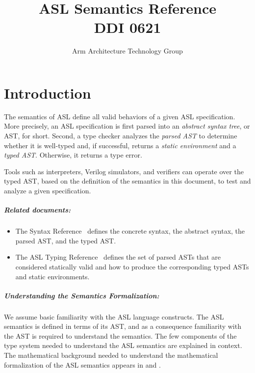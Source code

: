 \documentclass{book}
\author{Arm Architecture Technology Group}
\title{ASL Semantics Reference \\
       DDI 0621}
\begin{document}
\maketitle

\tableofcontents{}





\chapter{Introduction}

The semantics of ASL define all valid behaviors of a given ASL specification.
More precisely, an ASL specification is first parsed into an \emph{abstract syntax tree},
or AST, for short. Second, a type checker analyzes the \emph{parsed AST} to determine whether it
is well-typed and, if successful, returns a \emph{static environment} and a \emph{typed AST}.
Otherwise, it returns a type error.

Tools such as interpreters, Verilog simulators, and verifiers can operate over the typed AST, based on the definition
of the semantics in this document, to test and analyze a given specification.

\paragraph{Related documents:}
\begin{itemize}
  \item The Syntax Reference~\cite{ASLAbstractSyntaxReference} defines the concrete syntax, the abstract syntax, the parsed AST,
        and the typed AST.
  \item The ASL Typing Reference~\cite{ASLTypingReference} defines the set of parsed ASTs that are considered statically valid
  and how to produce the corresponding typed ASTs and static environments.
\end{itemize}

\paragraph{Understanding the Semantics Formalization:}
We assume basic familiarity with the ASL language constructs. %
The ASL semantics is defined in terms of its AST,
and as a consequence familiarity with the AST is required to understand the semantics.
The few components of the type system needed to understand the ASL semantics are explained in context.
The mathematical background needed to understand the mathematical formalization
of the ASL semantics appears in  and .
\end{document}
